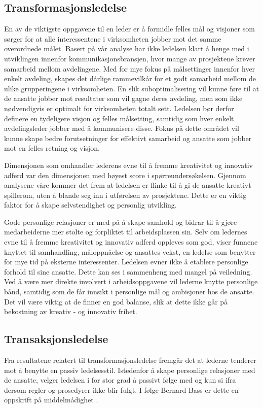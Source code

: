 \subsection{Transformasjonsledelse}
En av de viktigste oppgavene til en leder er å formidle felles mål og visjoner som sørger for at alle interessentene i virksomheten jobber mot det samme overordnede målet. Basert på vår analyse har ikke ledelsen klart å henge med i utviklingen innenfor kommunikasjonsbransjen, hvor mange av prosjektene krever samarbeid mellom avdelingene. Med for mye fokus på målsettinger innenfor hver enkelt avdeling, skapes det dårlige rammevilkår for et godt samarbeid mellom de ulike grupperingene i virksomheten. En slik suboptimalisering vil kunne føre til at de ansatte jobber mot resultater som vil gagne deres avdeling, men som ikke nødvendigvis er optimalt for virksomheten totalt sett. Ledelsen bør derfor definere en tydeligere visjon og felles målsetting, samtidig som hver enkelt avdelingsleder jobber med å kommunisere disse. Fokus på dette området vil kunne skape bedre forutsetninger for effektivt samarbeid og ansatte som jobber mot en felles retning og visjon.

\indent \newline
Dimensjonen som omhandler lederens evne til å fremme kreativitet og innovativ adferd var den dimensjonen med høyest score i spørreundersøkelsen. Gjennom analysene våre kommer det frem at ledelsen er flinke til å gi de ansatte kreativt spillerom, uten å blande seg inn i utførelsen av prosjektene. Dette er en viktig faktor for å skape selvstendighet og personlig utvikling. 

\indent \newline
Gode personlige relasjoner er med på å skape samhold og bidrar til å gjøre medarbeiderne mer stolte og forpliktet til arbeidsplassen sin. Selv om ledernes evne til å fremme kreativitet og innovativ adferd oppleves som god, viser funnene knyttet til samhandling, måloppnåelse og ansattes vekst, en ledelse som benytter for mye tid på eksterne interessenter. Ledelsen evner ikke å etablere personlige forhold til sine ansatte. Dette kan ses i sammenheng med mangel på veiledning. Ved å være mer direkte involvert i arbeidsoppgavene vil lederne knytte personlige bånd, samtidig som de får innsikt i personlige mål og ambisjoner hos de ansatte. Det vil være viktig at de finner en god balanse, slik at dette ikke går på bekostning av kreativ - og innovativ frihet.

\subsection{Transaksjonsledelse}
Fra resultatene relatert til transformasjonsledelse fremgår det at lederne tenderer mot å benytte en passiv ledelsesstil. Istedenfor å skape personlige relasjoner med de ansatte, velger ledelsen i for stor grad å passivt følge med og kun si ifra dersom regler og prosedyrer ikke blir fulgt. I følge Bernard Bass er dette en oppskrift på middelmådighet  \cite[s.~74]{PerspektiverLedelse}.

